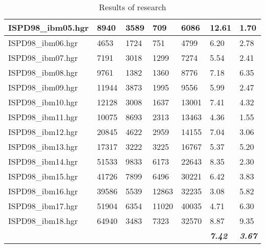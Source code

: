 \documentclass[12pt,a4paper,twocolumn]{article}
\begin{document}
\begin{table*}[tb]
\begin{tabular}{|lllll|l|l|}
	\multicolumn{1}{|l|}{ISPD98\_ibm05.hgr} &
	\multicolumn{1}{l|}{8940} &
	\multicolumn{1}{l|}{3589} &
	\multicolumn{1}{l|}{709} &
	6086 &
	12.61 &
	1.70 \\ \hline
	\multicolumn{1}{|l|}{ISPD98\_ibm06.hgr} &
	\multicolumn{1}{l|}{4653} &
	\multicolumn{1}{l|}{1724} &
	\multicolumn{1}{l|}{751} &
	4799 &
	6.20 &
	2.78 \\ \hline
	\multicolumn{1}{|l|}{ISPD98\_ibm07.hgr} &
	\multicolumn{1}{l|}{7191} &
	\multicolumn{1}{l|}{3018} &
	\multicolumn{1}{l|}{1299} &
	7274 &
	5.54 &
	2.41 \\ \hline
	\multicolumn{1}{|l|}{ISPD98\_ibm08.hgr} &
	\multicolumn{1}{l|}{9761} &
	\multicolumn{1}{l|}{1382} &
	\multicolumn{1}{l|}{1360} &
	8776 &
	7.18 &
	6.35 \\ \hline
	\multicolumn{1}{|l|}{ISPD98\_ibm09.hgr} &
	\multicolumn{1}{l|}{11944} &
	\multicolumn{1}{l|}{3873} &
	\multicolumn{1}{l|}{1995} &
	9556 &
	5.99 &
	2.47 \\ \hline
	\multicolumn{1}{|l|}{ISPD98\_ibm10.hgr} &
	\multicolumn{1}{l|}{12128} &
	\multicolumn{1}{l|}{3008} &
	\multicolumn{1}{l|}{1637} &
	13001 &
	7.41 &
	4.32 \\ \hline
	\multicolumn{1}{|l|}{ISPD98\_ibm11.hgr} &
	\multicolumn{1}{l|}{10075} &
	\multicolumn{1}{l|}{8693} &
	\multicolumn{1}{l|}{2313} &
	13463 &
	4.36 &
	1.55 \\ \hline
	\multicolumn{1}{|l|}{ISPD98\_ibm12.hgr} &
	\multicolumn{1}{l|}{20845} &
	\multicolumn{1}{l|}{4622} &
	\multicolumn{1}{l|}{2959} &
	14155 &
	7.04 &
	3.06 \\ \hline
	\multicolumn{1}{|l|}{ISPD98\_ibm13.hgr} &
	\multicolumn{1}{l|}{17317} &
	\multicolumn{1}{l|}{3222} &
	\multicolumn{1}{l|}{3225} &
	16767 &
	5.37 &
	5.20 \\ \hline
	\multicolumn{1}{|l|}{ISPD98\_ibm14.hgr} &
	\multicolumn{1}{l|}{51533} &
	\multicolumn{1}{l|}{9833} &
	\multicolumn{1}{l|}{6173} &
	22643 &
	8.35 &
	2.30 \\ \hline
	\multicolumn{1}{|l|}{ISPD98\_ibm15.hgr} &
	\multicolumn{1}{l|}{41726} &
	\multicolumn{1}{l|}{7899} &
	\multicolumn{1}{l|}{6496} &
	30221 &
	6.42 &
	3.83 \\ \hline
	\multicolumn{1}{|l|}{ISPD98\_ibm16.hgr} &
	\multicolumn{1}{l|}{39586} &
	\multicolumn{1}{l|}{5539} &
	\multicolumn{1}{l|}{12863} &
	32235 &
	3.08 &
	5.82 \\ \hline
	\multicolumn{1}{|l|}{ISPD98\_ibm17.hgr} &
	\multicolumn{1}{l|}{51904} &
	\multicolumn{1}{l|}{6354} &
	\multicolumn{1}{l|}{11020} &
	40035 &
	4.71 &
	6.30 \\ \hline
	\multicolumn{1}{|l|}{ISPD98\_ibm18.hgr} &
	\multicolumn{1}{l|}{64940} &
	\multicolumn{1}{l|}{3483} &
	\multicolumn{1}{l|}{7323} &
	32570 &
	8.87 &
	9.35 \\ \hline
	\multicolumn{5}{|l|}{} &
	\textit{\textbf{7.42}} &
	\textit{\textbf{3.67}} \\ \hline
\end{tabular}
		\caption{Results of research}
		\label{tab:res}
		\twocolumn
	\end{table*}
\end{document}
